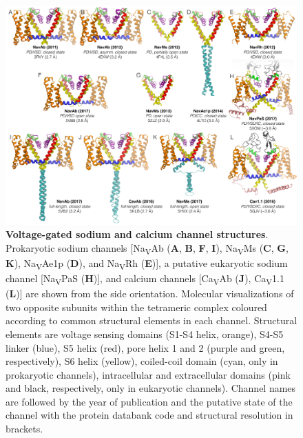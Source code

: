 \begin{refsection}
\begin{figure}[hp]
\includegraphics[width=1.0\textwidth]{introduction/navstructures}
\caption[Voltage-gated sodium and calcium channel structures]{\textbf{Voltage-gated sodium and calcium channel structures}. Prokaryotic sodium channels [Na\textsubscript{V}Ab (\textbf{A}, \textbf{B}, \textbf{F}, \textbf{I}), Na\textsubscript{V}Ms (\textbf{C}, \textbf{G}, \textbf{K}), Na\textsubscript{V}Ae1p (\textbf{D}), and Na\textsubscript{V}Rh (\textbf{E})], a putative eukaryotic sodium channel [Na\textsubscript{V}PaS (\textbf{H})], and calcium channels [Ca\textsubscript{V}Ab (\textbf{J}), Ca\textsubscript{V}1.1 (\textbf{L})] are shown from the side orientation. Molecular visualizations of two opposite subunits within the tetrameric complex coloured according to common structural elements in each channel. Structural elements are voltage sensing domains (S1-S4 helix, orange), S4-S5 linker (blue), S5 helix (red), pore helix 1 and 2 (purple and green, respectively), S6 helix (yellow), coiled-coil domain (cyan, only in prokaryotic channels), intracellular and extracellular domains (pink and black, respectively, only in eukaryotic channels). Channel names are followed by the year of publication and the putative state of the channel with the protein databank code and structural resolution in brackets.}
\label{fig:navstructures}
\centering
\end{figure}


\end{refsection}
